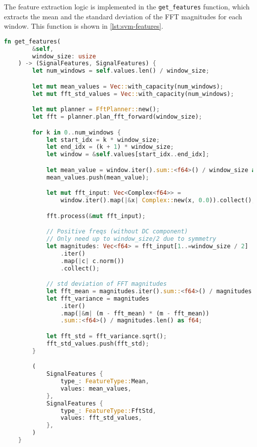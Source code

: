 The feature extraction logic is implemented in the \texttt{get\_features} function, which extracts the mean and the standard deviation of the FFT magnitudes for each window. This function is shown in \autoref{lst:svm-features}.

\begin{lstlisting}[language=Rust, caption={Feature extraction for the \ac{SVM} model}, label={lst:svm-features}]
    fn get_features(
        &self, 
        window_size: usize
    ) -> (SignalFeatures, SignalFeatures) {
        let num_windows = self.values.len() / window_size;

        let mut mean_values = Vec::with_capacity(num_windows);
        let mut fft_std_values = Vec::with_capacity(num_windows);

        let mut planner = FftPlanner::new();
        let fft = planner.plan_fft_forward(window_size);

        for k in 0..num_windows {
            let start_idx = k * window_size;
            let end_idx = (k + 1) * window_size;
            let window = &self.values[start_idx..end_idx];

            let mean_value = window.iter().sum::<f64>() / window_size as f64;
            mean_values.push(mean_value);

            let mut fft_input: Vec<Complex<f64>> =
                window.iter().map(|&x| Complex::new(x, 0.0)).collect();

            fft.process(&mut fft_input);

            // Positive freqs (without DC component)
            // Only need up to window_size/2 due to symmetry
            let magnitudes: Vec<f64> = fft_input[1..=window_size / 2]
                .iter()
                .map(|c| c.norm())
                .collect();

            // std deviation of FFT magnitudes
            let fft_mean = magnitudes.iter().sum::<f64>() / magnitudes.len() as f64;
            let fft_variance = magnitudes
                .iter()
                .map(|&m| (m - fft_mean) * (m - fft_mean))
                .sum::<f64>() / magnitudes.len() as f64;

            let fft_std = fft_variance.sqrt();
            fft_std_values.push(fft_std);
        }

        (
            SignalFeatures {
                type_: FeatureType::Mean,
                values: mean_values,
            },
            SignalFeatures {
                type_: FeatureType::FftStd,
                values: fft_std_values,
            },
        )
    }
\end{lstlisting}

